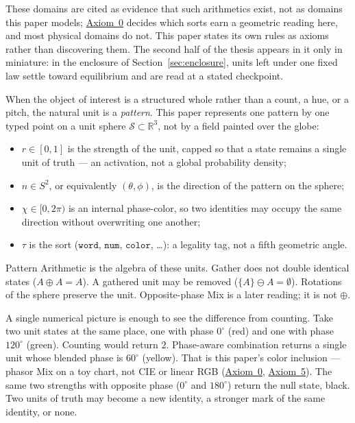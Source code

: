 \documentclass[12pt, a4paper]{article}
\begin{document}
These domains are cited as evidence that such arithmetics exist, not
as domains this paper models;
\hyperref[subsec:axiom0_admissibility]{Axiom~0} decides which sorts
earn a geometric reading here, and most physical domains do not. This
paper states its own rules as axioms rather than discovering them.
The second half of the thesis appears in it only in miniature: in the
enclosure of Section~\ref{sec:enclosure}, units left under one fixed
law settle toward equilibrium and are read at a stated checkpoint.

When the object of interest is a structured whole rather than a
count, a hue, or a pitch, the natural unit is a \emph{pattern}.
This paper represents one pattern by one typed point on a unit
sphere $\mathcal{S} \subset \mathbb{R}^3$, not by a field painted over the globe:
\begin{itemize}
    \item $r \in [0, 1]$ is the strength of the unit, capped so that a state remains a single unit of truth --- an activation, not a global probability density;
    \item $\hat n \in S^2$, or equivalently $(\theta, \phi)$, is the direction of the pattern on the sphere;
    \item $\chi \in [0, 2\pi)$ is an internal phase-color, so two identities may occupy the same direction without overwriting one another;
    \item $\tau$ is the sort ($\mathtt{word}$, $\mathtt{num}$, $\mathtt{color}$, \ldots): a legality tag, not a fifth geometric angle.
\end{itemize}
Pattern Arithmetic is the algebra of these units. Gather does not double identical states ($A \oplus A = A$). A gathered unit may be removed ($\{A\} \ominus A = \emptyset$). Rotations of the sphere preserve the unit. Opposite-phase Mix is a later reading; it is not $\oplus$.

A single numerical picture is enough to see the difference from counting. Take two unit states at the same place, one with phase $0^\circ$ (red) and one with phase $120^\circ$ (green). Counting would return $2$. Phase-aware combination returns a single unit whose blended phase is $60^\circ$ (yellow). That is this paper's color inclusion --- phasor Mix on a toy chart, not CIE or linear RGB (\hyperref[subsec:axiom0_admissibility]{Axiom~0}, \hyperref[subsec:axiom_interference]{Axiom~5}). The same two strengths with opposite phase ($0^\circ$ and $180^\circ$) return the null state, black. Two units of truth may become a new identity, a stronger mark of the same identity, or none.
\end{document}
